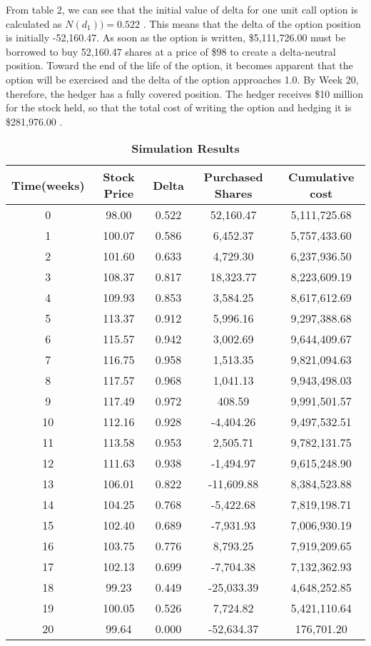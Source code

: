 \documentclass{article}
\begin{document}
From table 2, we can see that the initial value of delta for one unit call option is calculated as $ N(d_{1}))=0.522$ . This means that the delta of the option position is initially -52,160.47. As soon as the option is written, \$5,111,726.00 must be borrowed to buy 52,160.47 shares at a price of \$98 to create a delta-neutral position. Toward the end of the life of the option, it becomes apparent that the option will be exercised and the delta of the option approaches 1.0. By Week 20, therefore, the hedger has a fully covered position. The hedger receives \$10 million for the stock held, so that the total cost of writing the option and hedging it is \$281,976.00 .


\begin{table}[!htbp]
\centering
\caption{\bfseries Simulation Results}
\begin{tabular}{c c c c c }
\hline
\textbf{Time(weeks)} & \textbf{Stock Price} & \textbf{Delta}  & \textbf{Purchased Shares} & \textbf{Cumulative cost}\\
\hline
0	 & 98.00 	 & 0.522 	 & 52,160.47 	 & 5,111,725.68   \\
1	 & 100.07 	 & 0.586 	 & 6,452.37 	 & 5,757,433.60   \\
2	 & 101.60 	 & 0.633 	 & 4,729.30 	 & 6,237,936.50   \\
3	 & 108.37 	 & 0.817 	 & 18,323.77 	 & 8,223,609.19   \\
4	 & 109.93 	 & 0.853 	 & 3,584.25 	 & 8,617,612.69   \\
5	 & 113.37 	 & 0.912 	 & 5,996.16 	 & 9,297,388.68   \\
6	 & 115.57 	 & 0.942 	 & 3,002.69 	 & 9,644,409.67   \\
7	 & 116.75 	 & 0.958 	 & 1,513.35 	 & 9,821,094.63   \\
8	 & 117.57 	 & 0.968 	 & 1,041.13 	 & 9,943,498.03   \\
9	 & 117.49 	 & 0.972 	 & 408.59 	     & 9,991,501.57   \\
10	 & 112.16 	 & 0.928 	 & -4,404.26 	 & 9,497,532.51   \\
11	 & 113.58 	 & 0.953 	 & 2,505.71 	 & 9,782,131.75   \\
12	 & 111.63 	 & 0.938 	 & -1,494.97 	 & 9,615,248.90   \\
13	 & 106.01 	 & 0.822 	 & -11,609.88 	 & 8,384,523.88   \\
14	 & 104.25 	 & 0.768 	 & -5,422.68 	 & 7,819,198.71   \\
15	 & 102.40 	 & 0.689 	 & -7,931.93 	 & 7,006,930.19   \\
16	 & 103.75 	 & 0.776 	 & 8,793.25 	 & 7,919,209.65   \\
17	 & 102.13 	 & 0.699 	 & -7,704.38 	 & 7,132,362.93   \\
18	 & 99.23 	 & 0.449 	 & -25,033.39 	 & 4,648,252.85   \\
19	 & 100.05 	 & 0.526 	 & 7,724.82 	 & 5,421,110.64   \\
20	 & 99.64 	 & 0.000 	 & -52,634.37 	 & 176,701.20     \\
\hline
\end{tabular}
\end{table}
\end{document}

